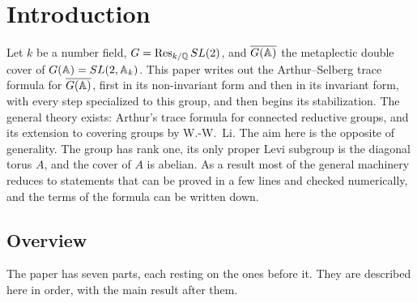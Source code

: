 %

\chapter{Introduction}\label{sec:intro}

Let $k$ be a number field, $G=\operatorname{Res}_{k/\mathbb{Q}}SL(2)$, and $\overline{G(\mathbb{A})}$
the metaplectic double cover of $G(\mathbb{A})=SL(2,\mathbb{A}_k)$. This paper writes out
the Arthur--Selberg trace formula for $\overline{G(\mathbb{A})}$, first in its
non-invariant form and then in its invariant form, with every step
specialized to this group, and then begins its stabilization. The general theory exists: Arthur's trace
formula for connected reductive groups, and its extension to covering
groups by W.-W.~Li. The aim here is the opposite of generality. The group
has rank one, its only proper Levi subgroup is the diagonal torus $A$,
and the cover of $A$ is abelian. As a result most of the general
machinery reduces to statements that can be proved in a few lines and
checked numerically, and the terms of the formula can be written down.

\section{Overview}\label{sec:overview}

The paper has seven parts, each resting on the ones before it. They are
described here in order, with the main result after them.

